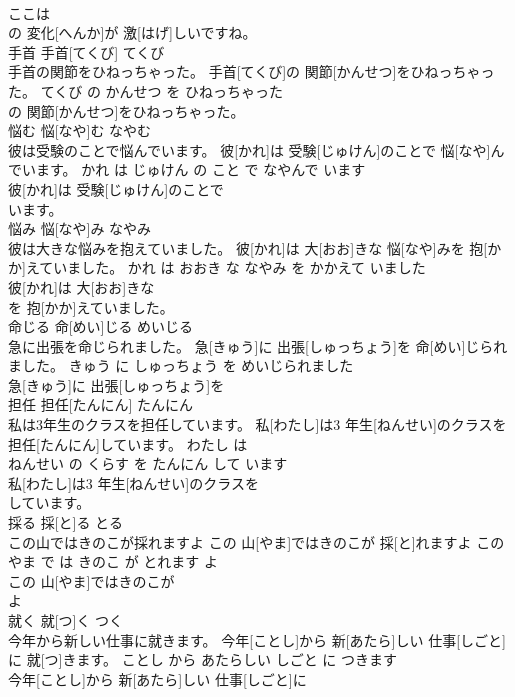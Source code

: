 \documentclass[8pt]{extreport}
\begin{document}
\begin{CJK}{UTF8}{min}
\\	ここは
\\	の 変化[へんか]が 激[はげ]しいですね。			
\\	手首	手首[てくび]	てくび	
\\	手首の関節をひねっちゃった。	手首[てくび]の 関節[かんせつ]をひねっちゃった。	てくび の かんせつ を ひねっちゃった	
\\	の 関節[かんせつ]をひねっちゃった。			
\\	悩む	悩[なや]む	なやむ	
\\	彼は受験のことで悩んでいます。	彼[かれ]は 受験[じゅけん]のことで 悩[なや]んでいます。	かれ は じゅけん の こと で なやんで います	
\\	彼[かれ]は 受験[じゅけん]のことで
\\	います。			
\\	悩み	悩[なや]み	なやみ	
\\	彼は大きな悩みを抱えていました。	彼[かれ]は 大[おお]きな 悩[なや]みを 抱[かか]えていました。	かれ は おおき な なやみ を かかえて いました	
\\	彼[かれ]は 大[おお]きな
\\	を 抱[かか]えていました。			
\\	命じる	命[めい]じる	めいじる	
\\	急に出張を命じられました。	急[きゅう]に 出張[しゅっちょう]を 命[めい]じられました。	きゅう に しゅっちょう を めいじられました	
\\	急[きゅう]に 出張[しゅっちょう]を
\\	担任	担任[たんにん]	たんにん	
\\	私は3年生のクラスを担任しています。	私[わたし]は3 年生[ねんせい]のクラスを 担任[たんにん]しています。	わたし は 
\\	ねんせい の くらす を たんにん して います	
\\	私[わたし]は3 年生[ねんせい]のクラスを
\\	しています。			
\\	採る	採[と]る	とる	
\\	この山ではきのこが採れますよ	この 山[やま]ではきのこが 採[と]れますよ	この やま で は きのこ が とれます よ	
\\	この 山[やま]ではきのこが
\\	よ			
\\	就く	就[つ]く	つく	
\\	今年から新しい仕事に就きます。	今年[ことし]から 新[あたら]しい 仕事[しごと]に 就[つ]きます。	ことし から あたらしい しごと に つきます	
\\	今年[ことし]から 新[あたら]しい 仕事[しごと]に

\end{CJK}
\end{document}
